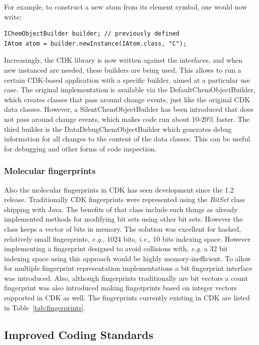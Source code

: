 \documentclass[10pt]{bmcart}
\begin{document}
For example, to construct a new atom from its element symbol, one would now write:

\begin{verbatim}
IChemObjectBuilder builder; // previously defined
IAtom atom = builder.newInstance(IAtom.class, "C");
\end{verbatim}

Increasingly, the CDK library is now written against the interfaces, and when new instanced
are needed, these builders are being used. This allows to run a certain CDK-based
application with a specific builder, aimed at a particular use case. The original
implementation is available via the DefaultChemObjectBuilder, which creates
classes that pass around change events, just like the original CDK data classes.
However, a SilentChemObjectBuilder has been introduced that does not pass around
change events, which makes code run about 10-20\% faster.
The third builder is the DataDebugChemObjectBuilder which generates debug information
for all changes to the content of the data classes. This can be useful for
debugging and other forms of code inspection.

\subsubsection*{Molecular fingerprints}
Also the molecular fingerprints in CDK has seen development since the 1.2
release. Traditionally CDK fingerprints were represented using the
\textit{BitSet} class shipping with Java. The benefits of that class include
such things as already implemented methods for modifying bit sets using other
bit sets. However the class keeps a vector of bits in memory. The solution was
excellent for hashed, relatively small fingerprints, \textit{e.g.}, 1024 bits,
\textit{i.e.}, 10 bits indexing space. However implementing a fingerprint
designed to avoid collisions with, \textit{e.g.} a 32 bit indexing space using
this approach would be highly memory-inefficient. To allow for multiple
fingerprint representation implementations a bit fingerprint interface was
introduced. Also, although fingerprints traditionally are bit vectors a count
fingerprint was also introduced making fingerprints based on integer vectors
supported in CDK as well. The fingerprints currently existing in CDK are listed
in Table~\ref{tab:fingerprints}.


\subsection*{Improved Coding Standards}
\end{document}
